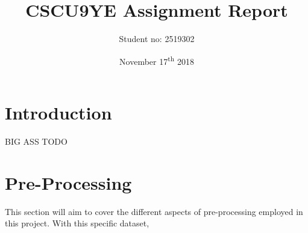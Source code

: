 \documentclass[11pt, a4paper]{article}
\title{CSCU9YE Assignment Report}
\author{Student no: 2519302}
\date{November 17\textsuperscript{th} 2018}
\begin{document}
\begin{titlepage}
\maketitle
\end{titlepage}
\doublespacing
{}
\tableofcontents
\newpage
\singlespacing

\section{Introduction}

BIG ASS TODO

\section{Pre-Processing}

This section will aim to cover the different aspects of pre-processing employed in this project. With this specific dataset, 




\end{document}
